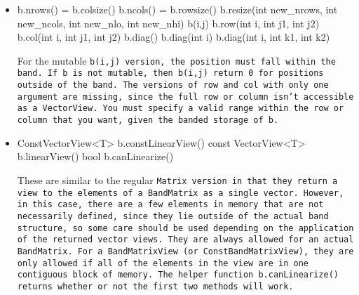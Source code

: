 \begin{itemize}

\item
\begin{tmvcode}
b.nrows() = b.colsize()
b.ncols() = b.rowsize()
b.resize(int new_nrows, int new_ncols, int new_nlo, int new_nhi)
b(i,j)
b.row(int i, int j1, int j2)
b.col(int i, int j1, int j2)
b.diag()
b.diag(int i)
b.diag(int i, int k1, int k2)
\end{tmvcode}
For the mutable \tt{b(i,j)} version, the position must fall within the
band.  If \tt{b} is not mutable, then \tt{b(i,j)} return 0 for
positions outside of the band.
The versions of \tt{row} and \tt{col} with only one argument are
missing, since the full row or column isn't accessible as a \tt{VectorView}.
You must specify a valid range within the row or column that you want, 
given the banded storage of \tt{b}.

\item
\begin{tmvcode}
ConstVectorView<T> b.constLinearView() const
VectorView<T> b.linearView()
bool b.canLinearize()
\end{tmvcode}
These are similar to the regular \tt{Matrix} version in that they return a view to the elements of a \tt{BandMatrix} as a single vector.  However, 
in this case, there are a few elements in memory that are not necessarily
defined, since they lie outside of the actual band structure, so some care
should be used depending on the application of the returned vector views.  
They are always allowed for an actual \tt{BandMatrix}.  For a \tt{BandMatrixView} (or \tt{ConstBandMatrixView}), they are only allowed if all of the elements in the view are in one contiguous block of memory.  The helper function \tt{b.canLinearize()} returns whether or not the first two methods will work.


\end{itemize}
